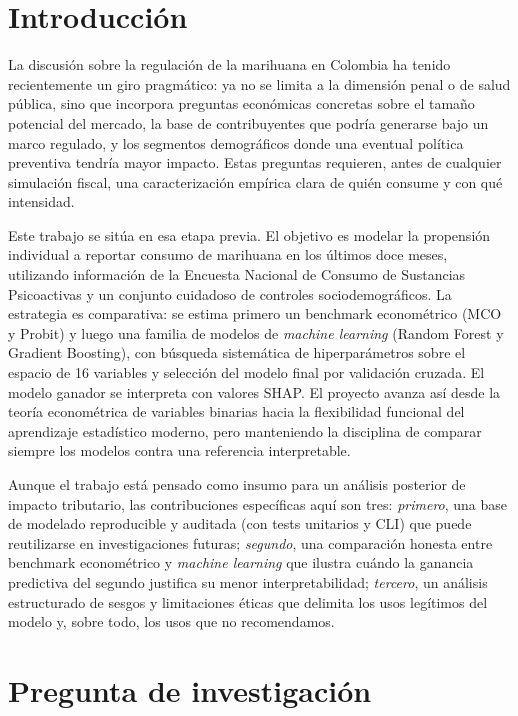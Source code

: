 \documentclass[12pt, a4paper]{article}
\begin{document}
\newpage

\tableofcontents

\newpage

\section{Introducción}

La discusión sobre la regulación de la marihuana en Colombia ha tenido recientemente un giro pragmático: ya no se limita a la dimensión penal o de salud pública, sino que incorpora preguntas económicas concretas sobre el tamaño potencial del mercado, la base de contribuyentes que podría generarse bajo un marco regulado, y los segmentos demográficos donde una eventual política preventiva tendría mayor impacto. Estas preguntas requieren, antes de cualquier simulación fiscal, una caracterización empírica clara de quién consume y con qué intensidad.

Este trabajo se sitúa en esa etapa previa. El objetivo es modelar la propensión individual a reportar consumo de marihuana en los últimos doce meses, utilizando información de la Encuesta Nacional de Consumo de Sustancias Psicoactivas y un conjunto cuidadoso de controles sociodemográficos. La estrategia es comparativa: se estima primero un benchmark econométrico (MCO y Probit) y luego una familia de modelos de \textit{machine learning} (Random Forest y Gradient Boosting), con búsqueda sistemática de hiperparámetros sobre el espacio de 16 variables y selección del modelo final por validación cruzada. El modelo ganador se interpreta con valores SHAP. El proyecto avanza así desde la teoría econométrica de variables binarias hacia la flexibilidad funcional del aprendizaje estadístico moderno, pero manteniendo la disciplina de comparar siempre los modelos contra una referencia interpretable.

Aunque el trabajo está pensado como insumo para un análisis posterior de impacto tributario, las contribuciones específicas aquí son tres: \emph{primero}, una base de modelado reproducible y auditada (con tests unitarios y CLI) que puede reutilizarse en investigaciones futuras; \emph{segundo}, una comparación honesta entre benchmark econométrico y \textit{machine learning} que ilustra cuándo la ganancia predictiva del segundo justifica su menor interpretabilidad; \emph{tercero}, un análisis estructurado de sesgos y limitaciones éticas que delimita los usos legítimos del modelo y, sobre todo, los usos que no recomendamos.

\section{Pregunta de investigación}
\end{document}

